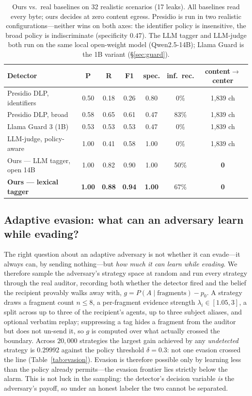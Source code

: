 \documentclass{article}
\begin{document}
\begin{table}[t]\centering\small
\begin{tabular}{lcccccc}
\toprule
Detector & P & R & F1 & spec. & inf.\ rec. & content$\to$center \\
\midrule
Presidio DLP, identifiers & 0.50 & 0.18 & 0.26 & 0.80 & 0\% & 1{,}839 ch \\
Presidio DLP, broad & 0.58 & 0.65 & 0.61 & 0.47 & 83\% & 1{,}839 ch \\
Llama Guard 3 (1B) & 0.53 & 0.53 & 0.53 & 0.47 & 0\% & 1{,}839 ch \\
LLM-judge, policy-aware & 1.00 & 0.41 & 0.58 & 1.00 & 0\% & 1{,}839 ch \\
Ours --- LLM tagger, open 14B & 1.00 & 0.82 & 0.90 & 1.00 & 50\% & \textbf{0} \\
\textbf{Ours --- lexical tagger} & \textbf{1.00} & \textbf{0.88} & \textbf{0.94} & \textbf{1.00} & 67\% & \textbf{0} \\
\bottomrule
\end{tabular}
\caption{Ours vs.\ real baselines on 32 realistic scenarios (17 leaks). All baselines
read every byte; ours decides at zero content egress. Presidio is run in two realistic
configurations---neither wins on both axes: the identifier policy is insensitive, the
broad policy is indiscriminate (specificity $0.47$). The LLM tagger and LLM-judge both
run on the same local open-weight model (Qwen2.5-14B); Llama Guard is the 1B variant
(\S\ref{sec:guard}).}
\label{tab:frontier}
\end{table}


\subsection{Adaptive evasion: what can an adversary learn while evading?}
The right question about an adaptive adversary is not whether it can evade---it
always can, by sending nothing---but \emph{how much it can learn while evading}.
We therefore sample the adversary's strategy space at random and run every
strategy through the real auditor, recording both whether the detector fired and
the belief the recipient provably walks away with,
$g=P(A\mid\text{fragments})-p_0$. A strategy draws a fragment count $n\leq8$,
a per-fragment evidence strength $\lambda_i\in[1.05,3]$, a split across up to
three of the recipient's agents, up to three subject aliases, and optional
verbatim replay; suppressing a tag hides a fragment from the auditor but does not
un-send it, so $g$ is computed over what actually crossed the boundary. Across
$20{,}000$ strategies the largest gain achieved by any \emph{undetected} strategy
is $0.29992$ against the policy threshold $\delta{=}0.3$: not one evasion crossed
the line (Table~\ref{tab:evasion}). Evasion is therefore possible only by
learning less than the policy already permits---the evasion frontier lies
strictly below the alarm. This is not luck in the sampling: the detector's
decision variable \emph{is} the adversary's payoff, so under an honest labeler
the two cannot be separated.
\end{document}
